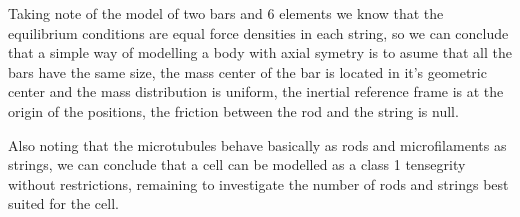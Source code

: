 Taking note of the model of two bars and 6 elements we know that the equilibrium conditions are equal force densities in each string, so we can conclude that a simple way of modelling a body with axial symetry is to asume that all the bars have the same size, the mass center of the bar is located in it's geometric center and the mass distribution is uniform, the inertial reference frame is at the origin of the positions, the friction between the rod and the string is null.

Also noting that the microtubules behave basically as rods and microfilaments as strings, we can conclude that a cell can be modelled as a class 1 tensegrity without restrictions, remaining to investigate the number of rods and strings best suited for the cell.
